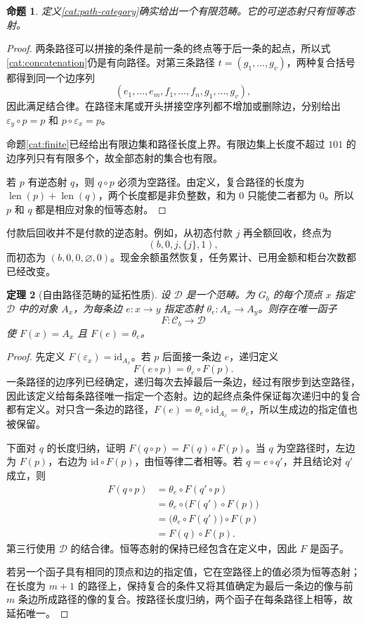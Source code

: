\documentclass[UTF8,a4paper]{ctexbook}
\newtheorem{theorem}{定理}[chapter]
\newtheorem{proposition}[theorem]{命题}
\theoremstyle{definition}
\numberwithin{equation}{chapter}
\newcommand{\1}{\mathbf{1}}
\begin{document}
\begin{proposition}\label{cat:path-axioms}
定义\ref{cat:path-category}确实给出一个有限范畴。它的可逆态射只有恒等态射。
\end{proposition}
\begin{proof}
两条路径可以拼接的条件是前一条的终点等于后一条的起点，所以式\eqref{cat:concatenation}仍是有向路径。对第三条路径 $t=(g_1,\ldots,g_v)$，两种复合括号都得到同一个边序列
\[
(e_1,\ldots,e_m,f_1,\ldots,f_n,g_1,\ldots,g_v),
\]
因此满足结合律。在路径末尾或开头拼接空序列都不增加或删除边，分别给出 $\varepsilon_y\circ p=p$ 和 $p\circ\varepsilon_x=p$。

命题\ref{cat:finite}已经给出有限边集和路径长度上界。有限边集上长度不超过 $101$ 的边序列只有有限多个，故全部态射的集合也有限。

若 $p$ 有逆态射 $q$，则 $q\circ p$ 必须为空路径。由定义，复合路径的长度为 $\operatorname{len}(p)+\operatorname{len}(q)$，两个长度都是非负整数，和为 $0$ 只能使二者都为 $0$。所以 $p$ 和 $q$ 都是相应对象的恒等态射。
\end{proof}

付款后回收并不是付款的逆态射。例如，从初态付款 $j$ 再全额回收，终点为
\[
(b,0,j,\{j\},1),
\]
而初态为 $(b,0,0,\varnothing,0)$。现金余额虽然恢复，任务累计、已用金额和柜台次数都已经改变。

\begin{theorem}[自由路径范畴的延拓性质]\label{cat:free-property}
设 $\mathcal D$ 是一个范畴。为 $G_b$ 的每个顶点 $x$ 指定 $\mathcal D$ 中的对象 $A_x$，为每条边 $e:x\to y$ 指定态射 $\theta_e:A_x\to A_y$。则存在唯一函子
\[
F:\mathcal C_b\longrightarrow\mathcal D
\]
使 $F(x)=A_x$ 且 $F(e)=\theta_e$。
\end{theorem}
\begin{proof}
先定义 $F(\varepsilon_x)=\mathrm{id}_{A_x}$。若 $p$ 后面接一条边 $e$，递归定义
\[
F(e\circ p)=\theta_e\circ F(p).
\]
一条路径的边序列已经确定，递归每次去掉最后一条边，经过有限步到达空路径，因此该定义给每条路径唯一指定一个态射。边的起终点条件保证每次递归中的复合都有定义。对只含一条边的路径，$F(e)=\theta_e\circ\mathrm{id}_{A_x}=\theta_e$，所以生成边的指定值也被保留。

下面对 $q$ 的长度归纳，证明 $F(q\circ p)=F(q)\circ F(p)$。当 $q$ 为空路径时，左边为 $F(p)$，右边为 $\mathrm{id}\circ F(p)$，由恒等律二者相等。若 $q=e\circ q'$，并且结论对 $q'$ 成立，则
\begin{align*}
F(q\circ p)
&=\theta_e\circ F(q'\circ p)\\
&=\theta_e\circ\bigl(F(q')\circ F(p)\bigr)\\
&=\bigl(\theta_e\circ F(q')\bigr)\circ F(p)\\
&=F(q)\circ F(p).
\end{align*}
第三行使用 $\mathcal D$ 的结合律。恒等态射的保持已经包含在定义中，因此 $F$ 是函子。

若另一个函子具有相同的顶点和边的指定值，它在空路径上的值必须为恒等态射；在长度为 $m+1$ 的路径上，保持复合的条件又将其值确定为最后一条边的像与前 $m$ 条边所成路径的像的复合。按路径长度归纳，两个函子在每条路径上相等，故延拓唯一。
\end{proof}
\end{document}
